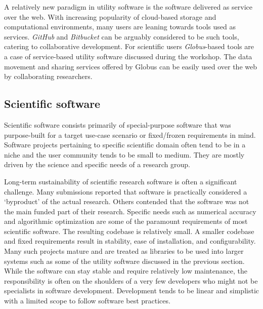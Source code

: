 \documentclass[11pt, oneside]{amsart}
\newcommand{\note}[1]{ {\textcolor{red}    { #1 }}}
\begin{document}
A relatively new paradigm in utility software is the software delivered as
service over the web. With increasing popularity of cloud-based storage and
computational environments, many users are leaning towards tools used as
services. \emph{GitHub} and \emph{Bitbucket} can be arguably considered to be
such tools, catering to collaborative development. For scientific users
\emph{Globus}-based tools are a case of service-based utility software
discussed during the workshop. The data movement and sharing services offered
by Globus can be easily used over the web by collaborating researchers.
%
%
%
%

\subsection{Scientific software}

Scientific software consists primarily of special-purpose software that was
purpose-built for a target use-case scenario or fixed/frozen requirements in
mind.  Software projects pertaining to specific scientific domain often tend to
be in a niche and the user community tends to be small to medium. They are
mostly driven by the science and specific needs of a research group.

Long-term sustainability of scientific research software is often a significant
challenge. Many submissions reported that software is practically considered a
`byproduct' of the actual research. Others contended that the software was not
the main funded part of their research.  Specific needs such as numerical
accuracy and algorithmic optimization are some of the paramount requirements of
most scientific software.  The resulting codebase is relatively small. A
smaller codebase and fixed requirements result in stability, ease of
installation, and configurability.  Many such projects mature and are treated
as libraries to be used into larger systems such as some of the utility
software discussed in the previous section.  While the software can stay stable
and require relatively low maintenance, the responsibility is often on the
shoulders of a very few developers who might not be specialists in software
development. Development tends to be linear and simplistic with a limited
scope to follow software best practices.
\end{document}
